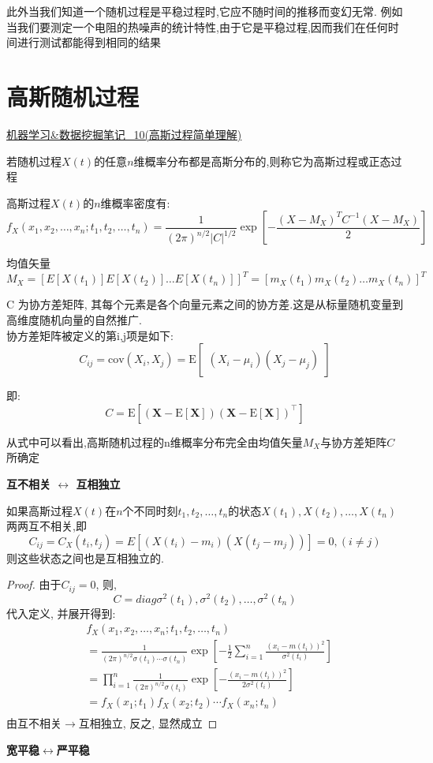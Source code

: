 \documentclass{article}
\begin{document}
此外当我们知道一个随机过程是平稳过程时,它应不随时间的推移而变幻无常.
例如当我们要测定一个电阻的热噪声的统计特性,由于它是平稳过程,因而我们在任何时间进行测试都能得到相同的结果

\section{高斯随机过程}
\href{http://www.cnblogs.com/tornadomeet/archive/2013/06/14/3135380.html}{机器学习\&数据挖掘笔记\_10(高斯过程简单理解)}

若随机过程$X(t)$的任意$n$维概率分布都是高斯分布的,则称它为高斯过程或正态过程

高斯过程$X(t)$的$n$维概率密度有:
$$
f_X(x_1, x_2, \ldots, x_n; t_1, t_2, \ldots, t_n) = 
\frac{1}{(2\pi)^{n/2} |C|^{1/2}} \exp[- \frac{(X - M_X)^T C^{-1} (X - M_X)}{2}]
$$

均值矢量
$$ M_X = [E[X(t_1)] E[X(t_2)] \ldots E[X(t_n)]]^T = [m_X(t_1) m_X(t_2) \ldots m_X(t_n)]^T $$

C 为协方差矩阵, 其每个元素是各个向量元素之间的协方差.这是从标量随机变量到高维度随机向量的自然推广.\\
协方差矩阵被定义的第i,j项是如下:
$$ C_{ij} = \mathrm{cov}(X_i, X_j) = \mathrm{E}\begin{bmatrix} (X_i - \mu_i)(X_j - \mu_j) \end{bmatrix} $$

即:
$$
C=\mathrm{E}
\left[
 \left(
 \textbf{X} - \mathrm{E}[\textbf{X}]
 \right)
 \left(
 \textbf{X} - \mathrm{E}[\textbf{X}]
 \right)^\top
\right]
$$

从式中可以看出,高斯随机过程的n维概率分布完全由均值矢量$M_X$与协方差矩阵$C$所确定

\textbf{互不相关 $\leftrightarrow$ 互相独立}
\begin{theorem}
如果高斯过程$X(t)$在$n$个不同时刻$t_1, t_2, \ldots, t_n$的状态$X(t_1), X(t_2), \ldots, X(t_n)$两两互不相关,即
$$
C_{ij} = C_X(t_i, t_j) = E[(X(t_i) - m_i)(X(t_j - m_j))] = 0, (i \neq j)
$$
则这些状态之间也是互相独立的.
\end{theorem}
\begin{proof}
由于$C_{ij} = 0$, 则, 
$$ C = diag{\sigma^2(t_1), \sigma^2(t_2), \ldots, \sigma^2(t_n)}$$
代入定义, 并展开得到:
$$
\begin{aligned}
& f_X(x_1, x_2, \ldots, x_n; t_1, t_2, \ldots, t_n) \\
& = \frac{1}{(2\pi)^{n/2} \sigma(t_1) \cdots \sigma(t_n)} \exp[-\frac{1}{2} \sum_{i=1}^n \frac{(x_i - m(t_i))^2}{\sigma^2(t_i)}]\\
& = \prod_{i=1}^n \frac{1}{(2\pi)^{n/2} \sigma(t_i)} \exp[-\frac{(x_i - m(t_i))^2}{2 \sigma^2(t_i)}]\\
& = f_X(x_1; t_1) f_X(x_2; t_2) \cdots f_X(x_n; t_n)\\
\end{aligned}
$$
由互不相关$\rightarrow$互相独立, 反之, 显然成立
\end{proof}

\textbf{宽平稳$\leftrightarrow$严平稳}
\begin{theorem}
\end{theorem}
\end{document}
